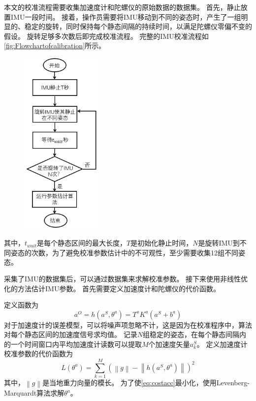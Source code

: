 \documentclass[
  type=master
]{gdutthesis}
\begin{document}
本文的校准流程需要收集加速度计和陀螺仪的原始数据的数据集。
首先，静止放置IMU一段时间。
接着，操作员需要将IMU移动到不同的姿态时，产生了一组明显的、稳定的旋转，同时保持每个静态间隔的持续时间，以满足陀螺仪零偏不变的假设。
旋转足够多次数后即完成校准流程。
完整的IMU校准流程如\autoref{fig:Flowchartofcalibration}所示。
\begin{figure}[H]
	\centering
	\includegraphics[width=0.36\textwidth]{屏幕截图 2022-06-08 104040.png}
	\label{fig:Flowchartofcalibration}
\end{figure}
其中，$t_{wait}$是每个静态区间的最大长度，$T$是初始化静止时间，$N$是旋转IMU到不同姿态的次数，为了避免校准参数估计中的不可观性，至少需要收集12组不同姿态。

采集了IMU的数据集后，可以通过数据集来求解校准参数。
接下来使用非线性优化的方法估计IMU参数。
首先需要定义加速度计和陀螺仪的代价函数。

定义函数为
\begin{equation}
	a^O=h(a^S,\theta^a) =T^a K^a (a^S + b^a)
\end{equation}
对于加速度计的误差模型，可以将噪声项忽略不计，这是因为在校准程序中，算法对每个静态区间的加速度信号求均值。
记录$N$组稳定的姿态，在每个静态间隔内的一个时间窗口内平均加速度计读数可以提取$M$个加速度矢量$a^S_k$。
定义加速度计校准参数的代价函数为
\begin{equation}\label{eq:costacc}
	L(\theta^a)=\sum_{k=1}^{M}(\left\|g\right\|-\left\|h(a^S,\theta^a)\right\|)^2
\end{equation}
其中，$\left\|g\right\|$是当地重力向量的模长。
为了使\autoref{eq:costacc}最小化，使用Levenberg-Marquardt算法求解$\theta^a$。
\end{document}

